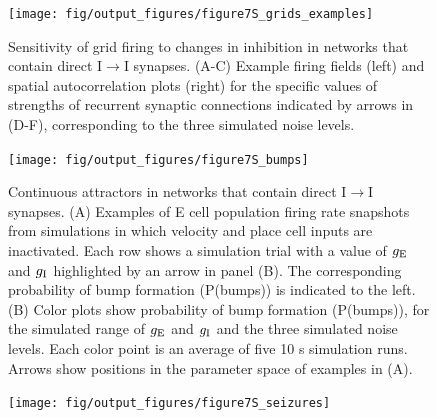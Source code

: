 \documentclass[a4paper,12pt]{article}
\newcommand{\ssc}[3]{\ensuremath{#1_{\text{#2}_{\text{#3}}}}}
\newcommand{\gE      }{\ssc{g}      {\scriptsize{E}}{}}
\newcommand{\gI      }{\ssc{g}      {\scriptsize{I}}{}}
\begin{document}
\setcounter{figure}{0}
\renewcommand{\figurename}{Figure 7 - figure supplement}


\begin{figure}[p]
    \internallinenumbers
    \centering
        \texttt{[image: fig/output\_figures/figure7S\_grids\_examples]}
    \caption{Sensitivity of grid firing to changes in inhibition in networks
    that contain direct I$\rightarrow$I synapses. (A-C) Example
    firing fields (left) and spatial autocorrelation plots (right) for the
    specific values of strengths of recurrent synaptic connections indicated by
    arrows in (D-F), corresponding to the three simulated noise levels.
    }
\end{figure}

\clearpage

\begin{figure}[p]
    \internallinenumbers
    \centering
        \texttt{[image: fig/output\_figures/figure7S\_bumps]}
    \caption{Continuous attractors in networks that contain direct
    I$\rightarrow$I synapses. (A) Examples of E cell population firing rate
    snapshots from simulations in which velocity and place cell inputs are
    inactivated. Each row shows a simulation trial with a value of $\gE$ and
    $\gI$
    highlighted by an arrow in panel (B). The corresponding probability of bump
    formation (P(bumps)) is indicated to the left.  (B) Color plots show
    probability of bump formation (P(bumps)), for the simulated range of $\gE$ and
    $\gI$ and the three simulated noise levels. Each color point is an average of
    five 10 s simulation runs. Arrows show positions in the parameter space of
    examples in (A).}
\end{figure}

\clearpage

\begin{figure}[p]
    \internallinenumbers
    \centering
        \texttt{[image: fig/output\_figures/figure7S\_seizures]}
\end{figure}

\clearpage
\end{document}
